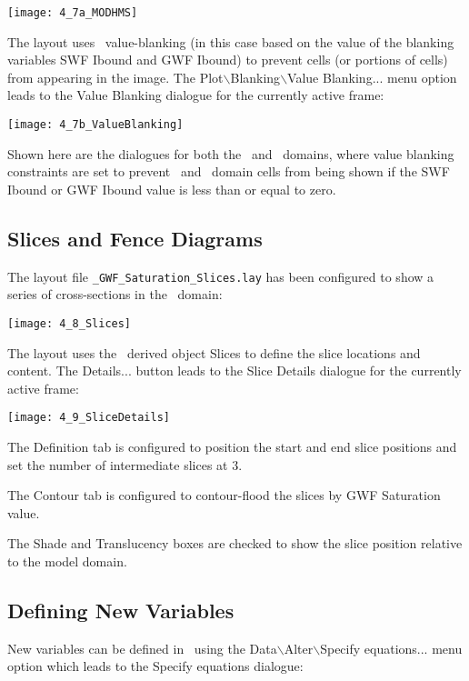         \texttt{[image: 4\_7a\_MODHMS]}

 The layout uses \tecplot\ value-blanking  (in this case based on the value of the blanking variables {\sf SWF Ibound} and {\sf GWF Ibound}) to prevent cells (or portions of cells) from appearing in the image.  The {\sf Plot$\backslash$Blanking$\backslash$Value Blanking...} menu option leads to the {\sf Value Blanking} dialogue for the currently active frame:

        \texttt{[image: 4\_7b\_ValueBlanking]}

Shown here are the dialogues for both the \swf\ and \gwf\ domains, where value blanking constraints are set to prevent \swf\ and \gwf\ domain cells from being shown if the {\sf SWF Ibound} or {\sf GWF Ibound} value is less than or equal to zero.

\subsection{Slices and Fence Diagrams}
The layout file {\tt \_GWF\_Saturation\_Slices.lay} has been configured to show a series of cross-sections in the \gwf\ domain:

        \texttt{[image: 4\_8\_Slices]}

The layout uses the \tecplot\ derived object {\sf Slices} to define the slice locations and content. The {\sf Details...} button leads to the {\sf Slice Details} dialogue for the currently active frame:

        \texttt{[image: 4\_9\_SliceDetails]}

The {\sf Definition} tab is configured to position the start and end slice positions and set the number of intermediate slices at 3.

The {\sf Contour} tab is configured to contour-flood the slices by {\sf GWF Saturation} value.

The {\sf Shade} and {\sf Translucency} boxes are checked to show the slice position relative to the model domain.

\subsection{Defining New Variables}
New variables can be defined in \tecplot\ using the {\sf Data$\backslash$Alter$\backslash$Specify equations...} menu option which leads to the {\sf Specify equations} dialogue:

